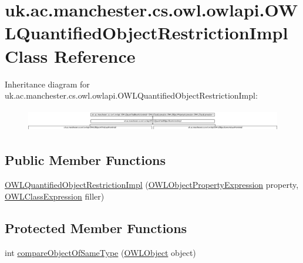 \hypertarget{classuk_1_1ac_1_1manchester_1_1cs_1_1owl_1_1owlapi_1_1_o_w_l_quantified_object_restriction_impl}{\section{uk.\-ac.\-manchester.\-cs.\-owl.\-owlapi.\-O\-W\-L\-Quantified\-Object\-Restriction\-Impl Class Reference}
\label{classuk_1_1ac_1_1manchester_1_1cs_1_1owl_1_1owlapi_1_1_o_w_l_quantified_object_restriction_impl}
}
Inheritance diagram for uk.\-ac.\-manchester.\-cs.\-owl.\-owlapi.\-O\-W\-L\-Quantified\-Object\-Restriction\-Impl\-:\begin{figure}[H]
\begin{center}
\leavevmode
\includegraphics[height=0.996441cm]{classuk_1_1ac_1_1manchester_1_1cs_1_1owl_1_1owlapi_1_1_o_w_l_quantified_object_restriction_impl}
\end{center}
\end{figure}
\subsection*{Public Member Functions}
\begin{DoxyCompactItemize}
\item 
\hyperlink{classuk_1_1ac_1_1manchester_1_1cs_1_1owl_1_1owlapi_1_1_o_w_l_quantified_object_restriction_impl_aaca0ba3776fba0ea07dac5907c8e3a18}{O\-W\-L\-Quantified\-Object\-Restriction\-Impl} (\hyperlink{interfaceorg_1_1semanticweb_1_1owlapi_1_1model_1_1_o_w_l_object_property_expression}{O\-W\-L\-Object\-Property\-Expression} property, \hyperlink{interfaceorg_1_1semanticweb_1_1owlapi_1_1model_1_1_o_w_l_class_expression}{O\-W\-L\-Class\-Expression} filler)
\end{DoxyCompactItemize}
\subsection*{Protected Member Functions}
\begin{DoxyCompactItemize}
\item 
int \hyperlink{classuk_1_1ac_1_1manchester_1_1cs_1_1owl_1_1owlapi_1_1_o_w_l_quantified_object_restriction_impl_a278346ff6c9f0ebf478b5cdab64cef25}{compare\-Object\-Of\-Same\-Type} (\hyperlink{interfaceorg_1_1semanticweb_1_1owlapi_1_1model_1_1_o_w_l_object}{O\-W\-L\-Object} object)
\end{DoxyCompactItemize}
